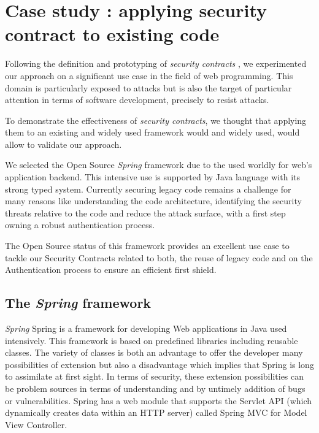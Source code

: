 \section{Case study : applying security contract to existing code}
\label{sec:case-study}

Following the definition and prototyping of \textit{security contracts} \cite{silva2020contract}, we experimented our approach on a significant use case in the field of web programming. This domain is particularly exposed to attacks but is also the target of particular attention in terms of software development, precisely to resist attacks.

To demonstrate the effectiveness of \textit{security contracts}, we thought that applying them to an existing and widely used framework would and widely used, would allow to validate our approach.

We selected the Open Source \textit{Spring} framework due to the used worldly for web's application backend. This intensive use is supported by Java language with its strong typed system.
Currently securing legacy code remains a challenge for many reasons like understanding the code architecture, identifying the security threats relative to the code and reduce the attack surface, with a first step owning a robust authentication process.

The Open Source status of this framework provides an excellent use case to tackle our Security Contracts related to both, the reuse of legacy code and on the Authentication process to ensure an efficient first shield. 


\subsection{The \textit{Spring} framework}

\textit{Spring} Spring is a framework for developing Web applications in Java used intensively.  This framework is based on predefined libraries including reusable classes. The variety of classes is both an advantage to offer the developer many possibilities of extension but also a disadvantage which implies that Spring is long to assimilate at first sight. In terms of security, these extension possibilities can be problem sources in terms of understanding and by untimely addition of bugs or vulnerabilities. 
Spring has a web module that supports the Servlet API (which dynamically creates data within an HTTP server) called Spring MVC for Model View Controller.


